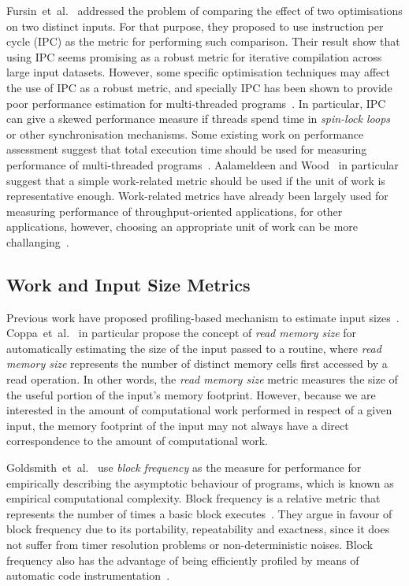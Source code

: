 \documentclass[sigplan,9pt]{acmart}
\newcommand{\etal}{et~al.}
\newcommand{\itercomp}{{iterative compilation}}
\begin{document}
Fursin~\etal~\cite{fursin07} addressed the problem of comparing the effect of two optimisations on two distinct inputs. For that purpose, they proposed to use instruction per cycle (IPC) as the metric for performing such comparison.
Their result show that using IPC seems promising as a robust metric for {\itercomp} across large input datasets.
However, some specific optimisation techniques may affect the use of IPC as a robust metric, and specially IPC has been shown to provide poor performance estimation for multi-threaded programs~\cite{alameldeen06,eyerman08}.
In particular, IPC can give a skewed performance measure if threads spend time in \textit{spin-lock loops} or other synchronisation mechanisms. 
Some existing work on performance assessment suggest that total execution time should be used for measuring performance of multi-threaded programs~\cite{alameldeen06,eyerman08}.
Aalameldeen and Wood~\cite{alameldeen06} in particular suggest that a simple work-related metric should be used if the unit of work is representative enough.
Work-related metrics have already been largely used for measuring performance of throughput-oriented applications, for other applications, however, choosing an appropriate unit of work can be more challanging~\cite{alameldeen06}.

\subsection{Work and Input Size Metrics}

Previous work have proposed profiling-based mechanism to estimate input sizes~\cite{zaparanuks12,coppa14}.
Coppa~\etal~\cite{coppa14} in particular propose the concept of \textit{read memory size} for automatically estimating the size of the input passed to a routine, where \textit{read memory size} represents the number of distinct memory cells first accessed by a read operation.
In other words, the \textit{read memory size} metric measures the size of the useful portion of the input's memory footprint.
However, because we are interested in the amount of computational work performed in respect of a given input, the memory footprint of the input may not always have a direct correspondence to  the amount of computational work.

Goldsmith~\etal~\cite{goldsmith07} use \textit{block frequency} as the measure for performance for empirically describing the asymptotic behaviour of programs, which is known as empirical computational complexity.
Block frequency is a relative metric that represents the number of times a basic block executes~\cite{ball94,ball96}.
They argue in favour of block frequency due to its portability, repeatability and exactness, since it does not suffer from timer resolution problems or non-deterministic noises.
Block frequency also has the advantage of being efficiently profiled by means of automatic code instrumentation~\cite{knuth73,ball94}.
\end{document}
